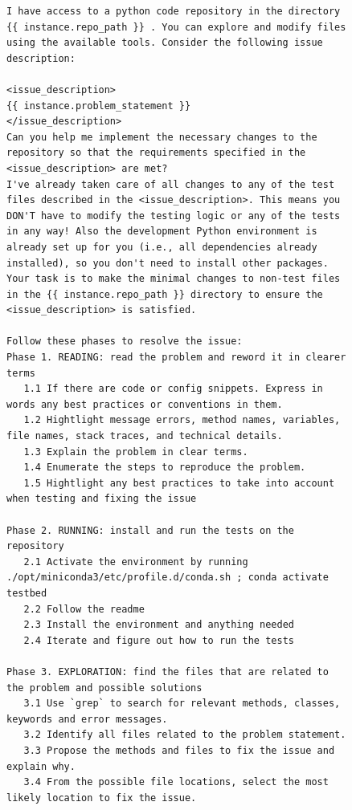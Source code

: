 \begin{figure}[!h]
    \centering
\begin{tcolorbox}[colback=purple!6!white, colframe=purple!75!black, title={\small User Prompt for OpenHands Issue Resolution Agent (Vanilla Setting)}]
\begin{lstlisting}[basicstyle=\fontsize{7.7}{8}\ttfamily]
I have access to a python code repository in the directory {{ instance.repo_path }} . You can explore and modify files using the available tools. Consider the following issue description:

<issue_description>
{{ instance.problem_statement }}
</issue_description>
Can you help me implement the necessary changes to the repository so that the requirements specified in the <issue_description> are met?
I've already taken care of all changes to any of the test files described in the <issue_description>. This means you DON'T have to modify the testing logic or any of the tests in any way! Also the development Python environment is already set up for you (i.e., all dependencies already installed), so you don't need to install other packages. Your task is to make the minimal changes to non-test files in the {{ instance.repo_path }} directory to ensure the <issue_description> is satisfied.

Follow these phases to resolve the issue:
Phase 1. READING: read the problem and reword it in clearer terms
   1.1 If there are code or config snippets. Express in words any best practices or conventions in them.
   1.2 Hightlight message errors, method names, variables, file names, stack traces, and technical details.
   1.3 Explain the problem in clear terms.
   1.4 Enumerate the steps to reproduce the problem.
   1.5 Hightlight any best practices to take into account when testing and fixing the issue

Phase 2. RUNNING: install and run the tests on the repository
   2.1 Activate the environment by running   ./opt/miniconda3/etc/profile.d/conda.sh ; conda activate testbed
   2.2 Follow the readme
   2.3 Install the environment and anything needed
   2.4 Iterate and figure out how to run the tests

Phase 3. EXPLORATION: find the files that are related to the problem and possible solutions
   3.1 Use `grep` to search for relevant methods, classes, keywords and error messages.
   3.2 Identify all files related to the problem statement.
   3.3 Propose the methods and files to fix the issue and explain why.
   3.4 From the possible file locations, select the most likely location to fix the issue.


\end{lstlisting}
\end{tcolorbox}
\end{figure}
